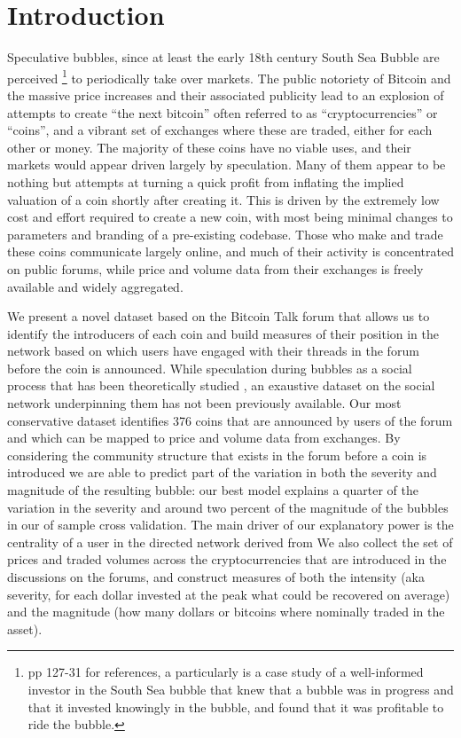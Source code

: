 \section{Introduction}

Speculative bubbles, since at least the early 18th century South Sea Bubble are perceived \footnote{\cite{garber2001famous} pp 127-31 for references, a particularly is \cite{temin2004riding} a case study of a well-informed investor in the South Sea bubble that knew that a bubble was in progress and that it invested knowingly in the bubble, and found that it was profitable to ride the bubble. } to periodically take over markets. %
The public notoriety of Bitcoin and the massive price increases and their associated publicity  lead to an explosion of attempts to create ``the next bitcoin'' often referred to as ``cryptocurrencies'' or ``coins'', and a vibrant set of exchanges where these are traded, either for each other or money.
The majority of these coins have no viable uses, and their markets would appear driven largely by speculation.
Many of them appear to be nothing but attempts at turning a quick profit from inflating the implied valuation of a coin shortly after creating it.
This is driven by the extremely low cost and effort required to create a new coin, with most being minimal changes to parameters and branding of a pre-existing codebase.
Those who make and trade these coins communicate largely online, and much of their activity is concentrated on public forums, while price and volume data from their exchanges is freely available and widely aggregated.


We present a novel dataset based on the Bitcoin Talk forum that allows us to identify the introducers of each coin and build measures of their position in the network based on which users have engaged with their threads in the forum before the coin is announced.
While speculation during bubbles as a social process that has been theoretically studied \cite{abolafia1988enacting, earl2007decision, bakker2010social, harras2011grow}, an exaustive dataset on the social network underpinning them has not been previously available.
Our most conservative dataset identifies 376 coins that are announced by users of the forum and which can be mapped to price and volume data from exchanges.
By considering the community structure that exists in the forum before a coin is introduced we are able to predict part of the variation in both the severity and magnitude of the resulting bubble: our best model explains a quarter of the variation in the severity and around two percent of the magnitude of the bubbles in our of sample cross validation. 
The main driver of our explanatory power is the centrality of a user in the directed network derived from 
We also collect the set of prices and traded volumes across the cryptocurrencies that are introduced in the discussions on the forums, and construct measures of both the intensity (aka severity, for each dollar invested at the peak what could be recovered on average) and the magnitude (how many dollars or bitcoins where nominally traded in the asset).

